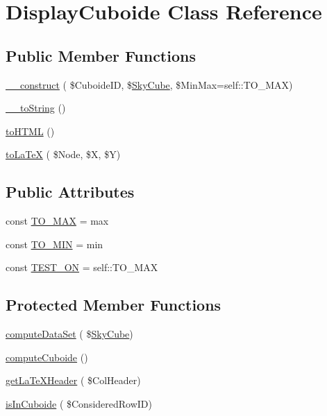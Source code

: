 \hypertarget{class_display_cuboide}{}\section{Display\+Cuboide Class Reference}
\label{class_display_cuboide}
\subsection*{Public Member Functions}
\begin{DoxyCompactItemize}
\item 
\hyperlink{class_display_cuboide_a9e65582b70a5c17de4ce9ad3ee7f51cd}{\+\_\+\+\_\+construct} ( \$Cuboide\+ID, \$\hyperlink{class_sky_cube}{Sky\+Cube}, \$Min\+Max=self\+::\+T\+O\+\_\+\+M\+AX)
\item 
\hyperlink{class_display_cuboide_a052175949aadbfd62fccceb3ecfdfd9e}{\+\_\+\+\_\+to\+String} ()
\item 
\hyperlink{class_display_cuboide_af79a766a7a6dbbc9edabfddbc5371023}{to\+H\+T\+ML} ()
\item 
\hyperlink{class_display_cuboide_a28f97d6c528f98b99d41c0124b4aad0e}{to\+La\+TeX} ( \$Node, \$X, \$Y)
\end{DoxyCompactItemize}
\subsection*{Public Attributes}
\begin{DoxyCompactItemize}
\item 
const \hyperlink{class_display_cuboide_a1e2af9c770b1b3347e5d07a9094a5b5b}{T\+O\+\_\+\+M\+AX} = \textquotesingle{}max\textquotesingle{}
\item 
const \hyperlink{class_display_cuboide_a8f47e910be1e56af06c646035e9cfb92}{T\+O\+\_\+\+M\+IN} = \textquotesingle{}min\textquotesingle{}
\item 
const \hyperlink{class_display_cuboide_a5abd1f75b4baff664a0c7f3381bb744f}{T\+E\+S\+T\+\_\+\+ON} = self\+::\+T\+O\+\_\+\+M\+AX
\end{DoxyCompactItemize}
\subsection*{Protected Member Functions}
\begin{DoxyCompactItemize}
\item 
\hyperlink{class_display_cuboide_a40d7338cee6f9b27e2772864b71edcab}{compute\+Data\+Set} ( \$\hyperlink{class_sky_cube}{Sky\+Cube})
\item 
\hyperlink{class_display_cuboide_ade706d53e065cd76a38c2e998d36f81c}{compute\+Cuboide} ()
\item 
\hyperlink{class_display_cuboide_a4e383e8a460e9785065e27d4db15f1dd}{get\+La\+Te\+X\+Header} ( \$Col\+Header)
\item 
\hyperlink{class_display_cuboide_a0ff1d1fb20501b079f5597ebfaa6f9cf}{is\+In\+Cuboide} ( \$Considered\+Row\+ID)
\end{DoxyCompactItemize}
